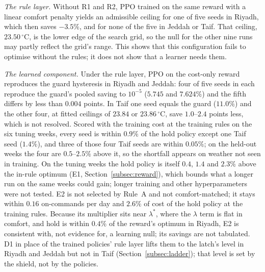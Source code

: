 \documentclass[pdflatex,sn-mathphys-num,iicol]{sn-jnl}
\theoremstyle{thmstyleone}\newtheorem{proposition}{Proposition}\newtheorem{corollary}{Corollary}
\theoremstyle{thmstyletwo}\newtheorem{remark}{Remark}\newtheorem{observation}{Observation}
\theoremstyle{thmstylethree}\newtheorem{definition}{Definition}
\begin{document}
\emph{The rule layer.} Without R1 and R2, PPO trained on the same reward with a linear comfort penalty yields an admissible ceiling for one of five seeds in Riyadh, which then saves $-3.5\%$, and for none of the five in Jeddah or Taif. That ceiling, $23.50\,^\circ$C, is the lower edge of the search grid, so the null for the other nine runs may partly reflect the grid's range. This shows that this configuration fails to optimise without the rules; it does not show that a learner needs them.

\emph{The learned component.} Under the rule layer, PPO on the cost-only reward reproduces the guard hysteresis in Riyadh and Jeddah: four of five seeds in each reproduce the guard's pooled saving to $10^{-5}$ ($5.745$ and $7.624\%$) and the fifth differs by less than $0.004$ points. In Taif one seed equals the guard ($11.0\%$) and the other four, at fitted ceilings of $23.84$ or $23.86\,^\circ$C, save $1.0$--$2.4$ points less, which is not resolved. Scored with the training cost at the training rules on the six tuning weeks, every seed is within $0.9\%$ of the hold policy except one Taif seed ($1.4\%$), and three of those four Taif seeds are within $0.05\%$; on the held-out weeks the four are $0.5$--$2.5\%$ above it, so the shortfall appears on weather not seen in training. On the tuning weeks the hold policy is itself $0.4$, $1.4$ and $2.3\%$ above the in-rule optimum (E1, Section~\ref{subsec:reward}), which bounds what a longer run on the same weeks could gain; longer training and other hyperparameters were not tested. E2 is not selected by Rule~A and not comfort-matched; it stays within $0.16$ on-commands per day and $2.6\%$ of cost of the hold policy at the training rules. Because its multiplier sits near $\lambda^\ast$, where the $\lambda$ term is flat in comfort, and hold is within $0.4\%$ of the reward's optimum in Riyadh, E2 is consistent with, not evidence for, a learning null; its savings are not tabulated. D1 in place of the trained policies' rule layer lifts them to the latch's level in Riyadh and Jeddah but not in Taif (Section~\ref{subsec:ladder}); that level is set by the shield, not by the policies.
\end{document}
